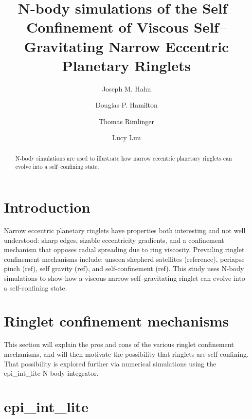 \documentclass[preprint]{aastex62}
\begin{document}
\title{N-body simulations of the Self--Confinement of 
Viscous Self--Gravitating Narrow Eccentric Planetary Ringlets}


\author{Joseph M. Hahn}

\author{Douglas P. Hamilton}

\author{Thomas Rimlinger}

\author{Lucy Luu}


\begin{abstract}

N-body simulations are used
to illustrate how narrow eccentric planetary ringlets can evolve into a 
self--confining state.

\end{abstract}




\section{Introduction}
\label{sec:intro}

Narrow eccentric planetary ringlets have properties both interesting and
not well understood: sharp edges,
sizable eccentricity gradients, and a confinement mechanism that
opposes radial spreading due to ring viscosity.
Prevailing ringlet confinement mechanisms include: 
unseen shepherd satellites (reference), periapse pinch (ref), self gravity (ref), and
self-confinement (ref). This study uses N-body simulations to show how a viscous narrow
self--gravitating ringlet can evolve into a self-confining state.

\section{Ringlet confinement mechanisms}
\label{sec:confinement}

This section will explain the pros and cons of the various ringlet confinement mechanisms,
and will then motivate the possibility that ringlets are self confining. That possibility
is explored further via numerical simulations using the epi\_int\_lite N-body integrator.

\section{epi\_int\_lite}
\label{sec:epi_int_lite}
\end{document}
